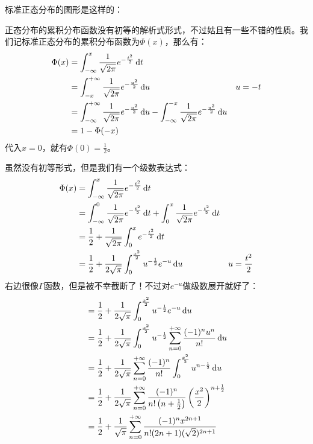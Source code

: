 标准正态分布的图形是这样的：



正态分布的累积分布函数没有初等的解析式形式，不过姑且有一些不错的性质。我们记标准正态分布的累积分布函数为$\Phi(x)$，那么有：
\begin{align*}
\Phi(x)&= \int_{-\infty}^{x}\frac{1}{\sqrt{2\pi}}e^{-\frac{t^2}{2}}\mathop{}\!\mathrm{d} t\\
&= \int_{-x}^{+\infty}\frac{1}{\sqrt{2\pi}}e^{-\frac{u^2}{2}}\mathop{}\!\mathrm{d} u&u=-t\\
&= \int_{-\infty}^{+\infty}\frac{1}{\sqrt{2\pi}}e^{-\frac{u^2}{2}}\mathop{}\!\mathrm{d} u -\int_{-\infty}^{-x}\frac{1}{\sqrt{2\pi}}e^{-\frac{u^2}{2}}\mathop{}\!\mathrm{d} u\\
&=1-\Phi(-x)
\end{align*}
代入$x=0$，就有$\Phi(0)=\frac 12$。

虽然没有初等形式，但是我们有一个级数表达式：
\begin{align*}
\Phi(x)&=\int_{-\infty}^{x}\frac{1}{\sqrt{2\pi}}e^{-\frac{t^2}{2}}\mathop{}\!\mathrm{d} t \\
&=\int_{-\infty}^{0}\frac{1}{\sqrt{2\pi}}e^{-\frac{t^2}{2}}\mathop{}\!\mathrm{d} t + \int_{0}^{x}\frac{1}{\sqrt{2\pi}}e^{-\frac{t^2}{2}}\mathop{}\!\mathrm{d} t\\
&= \frac 12 + \frac{1}{\sqrt{2\pi}}\int_{0}^{x}e^{-\frac{t^2}{2}}\mathop{}\!\mathrm{d} t\\
&= \frac 12 + \frac{1}{2\sqrt{\pi}}\int_{0}^{\frac{x^2}2}u^{-\frac12}e^{-u}\mathop{}\!\mathrm{d} u & u=\frac{t^2}{2}\\
\end{align*}
右边很像$\Gamma$函数，但是被不幸截断了！不过对$e^{-u}$做级数展开就好了：
\begin{align*}
&= \frac 12 + \frac{1}{2\sqrt{\pi}}\int_{0}^{\frac{x^2}2}u^{-\frac12}e^{-u}\mathop{}\!\mathrm{d} u\\
&= \frac 12 + \frac{1}{2\sqrt{\pi}}\int_{0}^{\frac{x^2}2}u^{-\frac12}\sum_{n=0}^{+\infty}\frac{(-1)^nu^n}{n!}\mathop{}\!\mathrm{d} u\\
&= \frac 12 + \frac{1}{2\sqrt{\pi}}\sum_{n=0}^{+\infty}\frac{(-1)^n}{n!}\int_{0}^{\frac{x^2}2}u^{n-\frac 12}\mathop{}\!\mathrm{d} u\\
&= \frac 12 + \frac{1}{2\sqrt{\pi}}\sum_{n=0}^{+\infty}\frac{(-1)^n}{n!\left(n+\frac{1}{2}\right)}\left(\frac{x^2}{2}\right)^{n+\frac 12}\\
&= \frac 12 + \frac{1}{\sqrt{\pi}}\sum_{n=0}^{+\infty}\frac{(-1)^nx^{2n+1}}{n!(2n+1)(\sqrt{2})^{2n+1}}\\
\end{align*}

